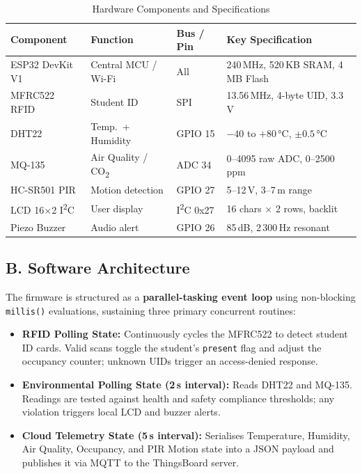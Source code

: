 \documentclass[12pt,a4paper]{article}
\begin{document}
\begin{table}[H]
\centering
\caption{Hardware Components and Specifications}
\label{tab:hw_specs}
\begin{tabular}{@{}llll@{}}
\toprule
\textbf{Component} & \textbf{Function} & \textbf{Bus / Pin} & \textbf{Key Specification} \\
\midrule
ESP32 DevKit V1   & Central MCU / Wi-Fi   & All         & 240\,MHz, 520\,KB SRAM, 4\,MB Flash \\
MFRC522 RFID      & Student ID            & SPI         & 13.56\,MHz, 4-byte UID, 3.3\,V \\
DHT22             & Temp.\ + Humidity     & GPIO 15     & $-40$ to $+80$\,°C, $\pm0.5$\,°C \\
MQ-135            & Air Quality / CO\textsubscript{2}  & ADC 34      & 0--4095 raw ADC, 0--2500\,ppm \\
HC-SR501 PIR      & Motion detection      & GPIO 27     & 5--12\,V, 3--7\,m range \\
LCD 16$\times$2 I\textsuperscript{2}C   & User display          & I\textsuperscript{2}C 0x27  & 16 chars $\times$ 2 rows, backlit \\
Piezo Buzzer      & Audio alert           & GPIO 26     & 85\,dB, 2\,300\,Hz resonant \\
\bottomrule
\end{tabular}
\end{table}

\subsection*{B. Software Architecture}

The firmware is structured as a \textbf{parallel-tasking event loop} using non-blocking
\texttt{millis()} evaluations, sustaining three primary concurrent routines:

\begin{itemize}
  \item \textbf{RFID Polling State:} Continuously cycles the MFRC522 to detect student
        ID cards. Valid scans toggle the student's \texttt{present} flag and adjust
        the occupancy counter; unknown UIDs trigger an access-denied response.
  \item \textbf{Environmental Polling State (2\,s interval):} Reads DHT22 and MQ-135.
        Readings are tested against health and safety compliance thresholds; any
        violation triggers local LCD and buzzer alerts.
  \item \textbf{Cloud Telemetry State (5\,s interval):} Serialises Temperature, Humidity,
        Air Quality, Occupancy, and PIR Motion state into a JSON payload and
        publishes it via MQTT to the ThingsBoard server.
\end{itemize}
\end{document}
